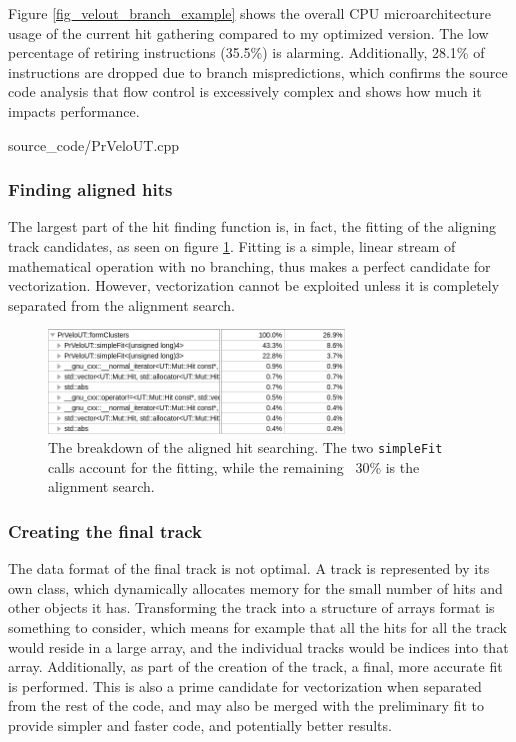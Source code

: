 \documentclass[12pt]{article}
\newcommand{\code}[1]{\texttt{#1}}
\begin{document}
Figure \ref{fig_velout_branch_example} shows the overall CPU microarchitecture usage of the current hit gathering compared to my optimized version. The low percentage of retiring instructions (35.5\%) is alarming. Additionally, 28.1\% of instructions are dropped due to branch mispredictions, which confirms the source code analysis that flow control is excessively complex and shows how much it impacts performance.
\newpage

	{source_code/PrVeloUT.cpp}
\newpage

\subsubsection{Finding aligned hits}

The largest part of the hit finding function is, in fact, the fitting of the aligning track candidates, as seen on figure \ref{fig_velout_hotspots_orig_formclusters}. Fitting is a simple, linear stream of mathematical operation with no branching, thus makes a perfect candidate for vectorization. However, vectorization cannot be exploited unless it is completely separated from the alignment search.

\begin{figure}[H]
	\begin{center}
		\includegraphics[width=0.7\textwidth]{velout_hotspots_orig_formclusters}
	\end{center}
	\caption[CPU hotspots of the VELO-UT aligned hit search]{The breakdown of the aligned hit searching. The two \code{simpleFit} calls account for the fitting, while the remaining ~30\% is the alignment search.}
	\label{fig_velout_hotspots_orig_formclusters}
\end{figure}


\subsubsection{Creating the final track}

The data format of the final track is not optimal. A track is represented by its own class, which dynamically allocates memory for the small number of hits and other objects it has. Transforming the track into a structure of arrays format is something to consider, which means for example that all the hits for all the track would reside in a large array, and the individual tracks would be indices into that array.
Additionally, as part of the creation of the track, a final, more accurate fit is performed. This is also a prime candidate for vectorization when separated from the rest of the code, and may also be merged with the preliminary fit to provide simpler and faster code, and potentially better results.
\end{document}
